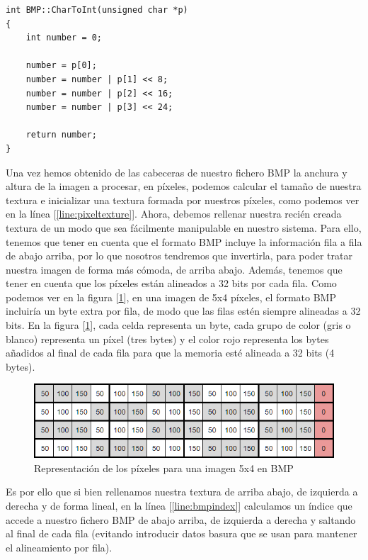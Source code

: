 \begin{lstlisting}[style=C-color, caption={Código para convertir una cadena de 4 bytes en un entero de 32 bits}, label=cod:chartoint]
int BMP::CharToInt(unsigned char *p)
{
    int number = 0;

    number = p[0];
    number = number | p[1] << 8;
    number = number | p[2] << 16;
    number = number | p[3] << 24;

    return number;
}
\end{lstlisting}

Una vez hemos obtenido de las cabeceras de nuestro fichero BMP la anchura y altura de la imagen a procesar, en píxeles, podemos calcular el tamaño de nuestra textura e inicializar una textura formada por nuestros píxeles, como podemos ver en la línea [\ref{line:pixeltexture}]. Ahora, debemos rellenar nuestra recién creada textura de un modo que sea fácilmente manipulable en nuestro sistema. Para ello, tenemos que tener en cuenta que el formato BMP incluye la información fila a fila de abajo arriba, por lo que nosotros tendremos que invertirla, para poder tratar nuestra imagen de forma más cómoda, de arriba abajo. Además, tenemos que tener en cuenta que los píxeles están alineados a 32 bits por cada fila. Como podemos ver en la figura [\ref{fig:pixelalignment}], en una imagen de 5x4 píxeles, el formato BMP incluiría un byte extra por fila, de modo que las filas estén siempre alineadas a 32 bits. En la figura [\ref{fig:pixelalignment}], cada celda representa un byte, cada grupo de color (gris o blanco) representa un píxel (tres bytes) y el color rojo representa los bytes añadidos al final de cada fila para que la memoria esté alineada a 32 bits (4 bytes).\\

\begin{figure}[h]
	\centering
	\includegraphics[width=12cm]{archivos/pixelalignment}
	\caption{Representación de los píxeles para una imagen 5x4 en BMP}
	\label{fig:pixelalignment}
\end{figure}

Es por ello que si bien rellenamos nuestra textura de arriba abajo, de izquierda a derecha y de forma lineal, en la línea [\ref{line:bmpindex}] calculamos un índice que accede a nuestro fichero BMP de abajo arriba, de izquierda a derecha y saltando al final de cada  fila (evitando introducir datos basura que se usan para mantener el alineamiento por fila).\\

